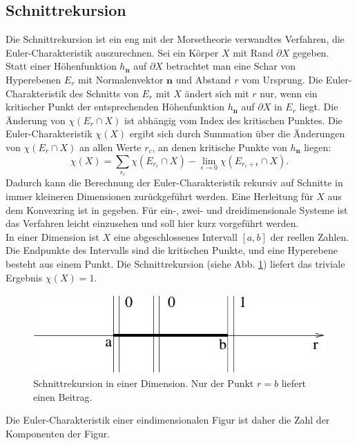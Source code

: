 \subsection{Schnittrekursion}
Die Schnittrekursion ist ein eng mit der Morsetheorie verwandtes Verfahren, die Euler-Charakteristik auszurechnen. Sei ein K\"orper $X$ mit Rand $\partial X$ gegeben. Statt einer H\"ohenfunktion $h_{\mathbf{n}}$ auf $\partial X$ betrachtet man eine Schar von Hyperebenen $E_r$ mit Normalenvektor $\mathbf{n}$ und Abstand $r$ vom Ursprung. Die Euler-Charakteristik des Schnitts von $E_r$ mit $X$ \"andert sich mit $r$ nur, wenn ein kritischer Punkt der entsprechenden H\"ohenfunktion $h_{\mathbf{n}}$ auf $\partial X$ in $E_r$ liegt. Die \"Anderung von $\chi(E_{r}\cap X)$ ist abh\"angig vom Index des kritischen Punktes. Die Euler-Charakteristik $\chi(X)$ ergibt sich durch Summation \"uber die \"Anderungen von $\chi(E_{r}\cap X)$ an allen Werte $r_c$, an denen kritische Punkte von $h_{\mathbf{n}}$ liegen:
\begin{equation}
  \chi(X)=\sum_{r_c} \chi(E_{r_c}\cap X)-\lim_{\epsilon \rightarrow 0}\chi(E_{r_c+\epsilon}\cap X).
\end{equation}
Dadurch kann die Berechnung der Euler-Charakteristik rekursiv auf Schnitte in immer kleineren Dimensionen zur\"uckgef\"uhrt werden. Eine Herleitung f\"ur $X$ aus dem Konvexring ist in \cite{Hadwinger:55} gegeben. F\"ur ein-, zwei- und dreidimensionale Systeme ist das Verfahren leicht einzusehen und soll hier kurz vorgef\"uhrt werden.\\
In einer Dimension ist $X$ eine abgeschlossenes Intervall $[a,b]$ der reellen Zahlen. Die Endpunkte des Intervalls sind die kritischen Punkte, und eine Hyperebene besteht aus einem Punkt. Die Schnittrekursion (siehe Abb. \ref{fig:morse1d}) liefert das triviale Ergebnis $\chi(X)=1$. 
\begin{figure}[bp]
  \centering
  \includegraphics{./Euler-figs/morse1d}
  \caption{Schnittrekursion in einer Dimension. Nur der Punkt $r=b$ liefert einen Beitrag.}
  \label{fig:morse1d}
\end{figure}
Die Euler-Charakteristik einer eindimensionalen Figur ist daher die Zahl der Komponenten der Figur.  
